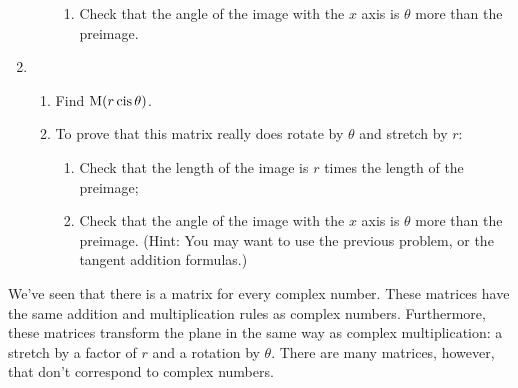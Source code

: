 \documentclass[../gatm.tex]{subfiles}
\begin{document}
\begin{enumerate}
\begin{enumerate}
\begin{enumerate}
\item Check that the angle of the image with the $x$ axis is $\theta$ more than the preimage.
\end{enumerate}
\end{enumerate}
\item \begin{enumerate}
\item Find $\operatorname{M} (r\operatorname{cis}\theta)$.
\item To prove that this matrix really does rotate by $\theta$ and stretch by $r$:
\begin{enumerate}
\item Check that the length of the image is $r$ times the length of the preimage;
\item Check that the angle of the image with the $x$ axis is $\theta$ more than the preimage. (Hint: You may want to use the previous problem, or the tangent addition formulas.)
\end{enumerate}
\end{enumerate}
\end{enumerate}

We've seen that there is a matrix for every complex number. These matrices have the same addition and multiplication rules as complex numbers. Furthermore, these matrices transform the plane in the same way as complex multiplication: a stretch by a factor of $r$ and a rotation by $\theta$. There are many matrices, however, that don't correspond to complex numbers.
\end{document}
